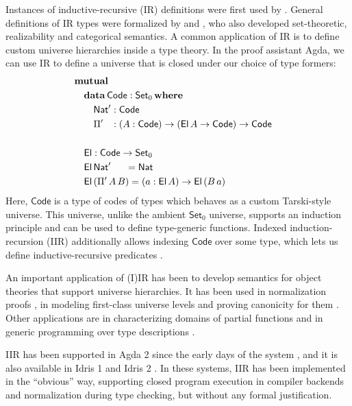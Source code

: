 \documentclass[acmsmall,screen,review,anonymous]{acmart}
\newcommand{\msf}[1]{{\mathsf{#1}}}
\newcommand{\mbf}[1]{{\mathbf{#1}}}
\newcommand{\data}{\mbf{data}}
\newcommand{\Set}{\msf{Set}}
\newcommand{\where}{\mbf{where}}
\newcommand{\Nat}{\msf{Nat}}
\newcommand{\El}{\msf{El}}
\newcommand{\Code}{\msf{Code}}
\begin{document}
Instances of inductive-recursive (IR) definitions were first used by
\citet{martin1975intuitionistic,martinlof84sambin}. General definitions of IR types were formalized
by \citet{DBLP:journals/jsyml/Dybjer00} and
\citet{dybjer99finite,DBLP:journals/jlp/DybjerS06,DBLP:journals/apal/DybjerS03}, who also developed
set-theoretic, realizability and categorical semantics. A common application of IR is to define
custom universe hierarchies inside a type theory. In the proof assistant Agda, we can use IR to
define a universe that is closed under our choice of type formers:
\begin{alignat*}{3}
  & \mbf{mutual} \\
  & \quad\data\,\Code : \Set_0\,\where \\
  & \quad\quad \Nat' : \Code\\
  & \quad\quad \Pi' \hspace{0.8em} : (A : \Code) \to (\El\,A \to \Code) \to \Code
  & \\
  & \\
  & \quad\El : \Code \to \Set_0 \\
  & \quad\El\,\Nat'\hspace{1.5em}  = \Nat \\
  & \quad\El\,(\Pi'\,A\,B) = (a : \El\,A) \to \El\,(B\,a)
\end{alignat*}
Here, $\Code$ is a type of codes of types which behaves as a custom Tarski-style universe. This
universe, unlike the ambient $\Set_0$ universe, supports an induction principle and can be used to
define type-generic functions. Indexed induction-recursion (IIR) additionally allows indexing
$\Code$ over some type, which lets us define inductive-recursive predicates \cite{DBLP:journals/jlp/DybjerS06}.

An important application of (I)IR has been to develop semantics for object theories that support
universe hierarchies. It has been used in normalization proofs
\cite{DBLP:journals/pacmpl/0001OV18,DBLP:journals/pacmpl/PujetT23,DBLP:journals/pacmpl/AbelDE23}, in
modeling first-class universe levels \cite{first-class-univ} and proving canonicity for them
\cite{DBLP:journals/corr/abs-2502-20485}. Other applications are in characterizing domains of
partial functions \cite{DBLP:conf/tphol/BoveC01} and in generic programming over type descriptions
\cite{diehl2017fully}.

IIR has been supported in Agda 2 since the early days of the system \cite{DBLP:conf/tphol/BoveDN09},
and it is also available in Idris 1 \cite{DBLP:journals/jfp/Brady13} and Idris 2
\cite{DBLP:conf/ecoop/Brady21}. In these systems, IIR has been implemented in the ``obvious'' way,
supporting closed program execution in compiler backends and normalization during type checking, but
without any formal justification.
\end{document}
